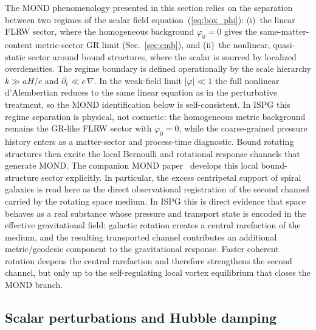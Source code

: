 \documentclass[aps,prd,onecolumn,superscriptaddress,nofootinbib,showpacs,12pt]{revtex4-2}
\begin{document}
The MOND phenomenology presented in this section relies on
the separation between two regimes of the scalar field
equation~(\ref{eq:box_phi}): (i)~the linear FLRW sector,
where the homogeneous background $\varphi_{0}=0$ gives
the same-matter-content metric-sector GR limit
(Sec.~\ref{sec:cmb}), and (ii)~the
nonlinear, quasi-static sector around bound structures,
where the scalar is sourced by localized overdensities.
The regime boundary is defined operationally by the
scale hierarchy $k \gg aH/c$ and
$\partial_{t} \ll c\,\nabla$.  In the weak-field limit
$|\varphi|\ll 1$ the full nonlinear d'Alembertian reduces
to the same linear equation as in the perturbative treatment,
so the MOND identification below is self-consistent.
In ISPG this regime separation is physical, not cosmetic:
the homogeneous metric background remains the GR-like FLRW
sector with $\varphi_{0}=0$, while the coarse-grained
pressure history enters as a matter-sector and process-time
diagnostic.  Bound rotating structures then excite the local
Bernoulli and rotational response channels that generate
MOND.  The companion MOND paper~\cite{Lotishvili2026MOND} develops this local
bound-structure sector explicitly.  In particular, the excess
centripetal support of spiral galaxies is read here as the
direct observational registration of the second channel
carried by the rotating space medium.  In ISPG this is
direct evidence that space behaves as a real substance whose
pressure and transport state is encoded in the effective
gravitational field: galactic rotation creates a central
rarefaction of the medium, and the resulting transported
channel contributes an additional metric/geodesic component
to the gravitational response.  Faster coherent rotation
deepens the central
rarefaction and therefore strengthens the second channel, but
only up to the self-regulating local vortex equilibrium that
closes the MOND branch.

\subsection{Scalar perturbations and Hubble damping}
\label{sec:hubble_damping}
\end{document}

